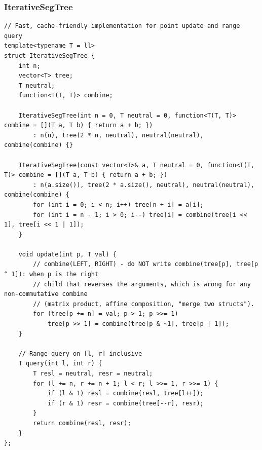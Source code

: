 \documentclass[9pt,a4paper,twocolumn]{extarticle}
\begin{document}
\subsubsection{IterativeSegTree}
\nopagebreak
\begin{lstlisting}
// Fast, cache-friendly implementation for point update and range query
template<typename T = ll>
struct IterativeSegTree {
    int n;
    vector<T> tree;
    T neutral;
    function<T(T, T)> combine;

    IterativeSegTree(int n = 0, T neutral = 0, function<T(T, T)> combine = [](T a, T b) { return a + b; })
        : n(n), tree(2 * n, neutral), neutral(neutral), combine(combine) {}

    IterativeSegTree(const vector<T>& a, T neutral = 0, function<T(T, T)> combine = [](T a, T b) { return a + b; })
        : n(a.size()), tree(2 * a.size(), neutral), neutral(neutral), combine(combine) {
        for (int i = 0; i < n; i++) tree[n + i] = a[i];
        for (int i = n - 1; i > 0; i--) tree[i] = combine(tree[i << 1], tree[i << 1 | 1]);
    }

    void update(int p, T val) {
        // combine(LEFT, RIGHT) - do NOT write combine(tree[p], tree[p ^ 1]): when p is the right
        // child that reverses the arguments, which is wrong for any non-commutative combine
        // (matrix product, affine composition, "merge two structs").
        for (tree[p += n] = val; p > 1; p >>= 1)
            tree[p >> 1] = combine(tree[p & ~1], tree[p | 1]);
    }

    // Range query on [l, r] inclusive
    T query(int l, int r) {
        T resl = neutral, resr = neutral;
        for (l += n, r += n + 1; l < r; l >>= 1, r >>= 1) {
            if (l & 1) resl = combine(resl, tree[l++]);
            if (r & 1) resr = combine(tree[--r], resr);
        }
        return combine(resl, resr);
    }
};
\end{lstlisting}

\filbreak
\end{document}
